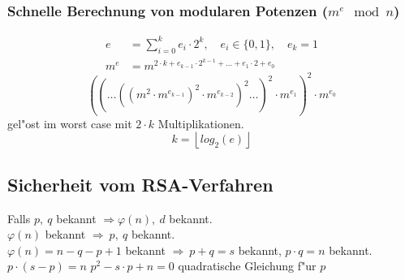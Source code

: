 \subsubsection{Schnelle Berechnung von modularen Potenzen ($m^e \mod{n}$)}
\begin{align*}
	e&=\sum^k_{i=0} e_i \cdot 2^k,\quad e_i \in \{0,1\},\quad e_k=1 \\
	m^e&=m^{2 \cdot k + e_{k-1}\cdot 2^{k-1}+ \ldots +e_1 \cdot 2+e_0}
\end{align*}
\[
	((\ldots ((m^2 \cdot m^{e_{k-1}})^2 \cdot m^{e_{k-2}})^2 \ldots)^2 \cdot m^{e_1})^2\cdot m^{e_0}
\]
gel"ost im worst case mit $2 \cdot k$ Multiplikationen.
\[
	k=\left\lfloor log_2(e)\right\rfloor
\]
\begin{center}
\end{center}

\subsection{Sicherheit vom RSA-Verfahren}
Falls $p,\ q$ bekannt $\Rightarrow \varphi(n),\ d$ bekannt.\\
$\varphi(n)$ bekannt $\Rightarrow\ p,\ q$ bekannt.\\
$\varphi(n)=n-q-p+1$ bekannt $\Rightarrow\ p+q=s$ bekannt, $p\cdot q=n$ bekannt.\\
$p\cdot (s-p)=n$ $p^2-s\cdot p + n = 0$ quadratische Gleichung f"ur $p$

